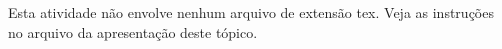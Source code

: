 Esta atividade não envolve nenhum arquivo de extensão tex.
Veja as instruções no arquivo da apresentação deste tópico.